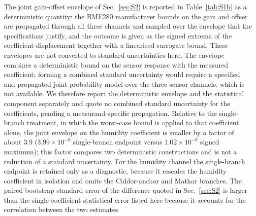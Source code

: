 \documentclass[aps,prapplied,reprint,superscriptaddress]{revtex4-2}
\begin{document}
The joint gain-offset envelope of Sec.~\ref{sec:S2} is reported in Table~\ref{tab:S1b} as a deterministic quantity: the BME280 manufacturer bounds on the gain and offset are propagated through all three channels and sampled over the envelope that the specifications justify, and the outcome is given as the signed extrema of the coefficient displacement together with a linearised surrogate bound. These envelopes are not converted to standard uncertainties here. The envelope combines a deterministic bound on the sensor response with the measured coefficient; forming a combined standard uncertainty would require a specified and propagated joint probability model over the three sensor channels, which is not available. We therefore report the deterministic envelope and the statistical component separately and quote no combined standard uncertainty for the coefficients, pending a measurand-specific propagation. Relative to the single-branch treatment, in which the worst-case bound is applied to that coefficient alone, the joint envelope on the humidity coefficient is smaller by a factor of about $3.9$ ($3.99\times10^{-9}$ single-branch endpoint versus $1.02\times10^{-9}$ signed maximum); this factor compares two deterministic constructions and is not a reduction of a standard uncertainty. For the humidity channel the single-branch endpoint is retained only as a diagnostic, because it rescales the humidity coefficient in isolation and omits the Ciddor-anchor and Mathar branches. The paired bootstrap standard error of the difference quoted in Sec.~\ref{sec:S2} is larger than the single-coefficient statistical error listed here because it accounts for the correlation between the two estimates.
\end{document}
